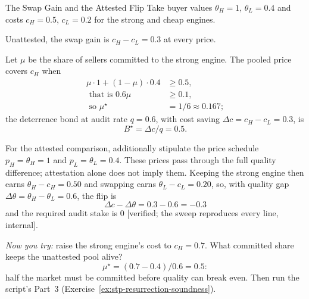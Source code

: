 \documentclass[11pt,a4paper]{article}
\theoremstyle{definition}
\begin{document}
\begin{pdexample}{The Swap Gain and the Attested Flip}
\setlength{\parskip}{4pt plus 1pt}
Take buyer values $\theta_H=1$, $\theta_L=0.4$ and costs $c_H=0.5$, $c_L=0.2$
for the strong and cheap engines.

Unattested, the swap
gain is $c_H-c_L=0.3$ at every price.

Let $\mu$ be the share of sellers committed to the strong engine. The pooled
price covers $c_H$ when
\[
\begin{aligned}
\mu\cdot 1+(1-\mu)\cdot 0.4 &\ge 0.5,\\
\text{ that is }0.6\mu &\ge 0.1,\\
\text{ so }\mu^\star &=1/6\approx 0.167;
\end{aligned}
\]
the deterrence bond at audit rate $q=0.6$, with cost saving
$\Delta c=c_H-c_L=0.3$, is
\[
B^\star=\Delta c/q=0.5.
\]

For the attested comparison, additionally stipulate the price schedule
$p_H=\theta_H=1$ and $p_L=\theta_L=0.4$. These prices pass through the full
quality difference; attestation alone does not imply them. Keeping the strong
engine then earns $\theta_H-c_H=0.50$ and swapping earns $\theta_L-c_L=0.20$, so,
with quality gap $\Delta\theta=\theta_H-\theta_L=0.6$, the flip is
\[
\Delta c-\Delta\theta=0.3-0.6=-0.3
\]
and the required audit stake
is $0$ [verified; the sweep reproduces every line, internal].

\emph{Now you
try:} raise the strong engine's cost to $c_H=0.7$. What committed share keeps
the unattested pool alive?
\[
\mu^\star=(0.7-0.4)/0.6=0.5:
\]
half the market
must be committed before quality can break even. Then run the
script's Part~3 (Exercise~\ref{ex:stp-resurrection-soundness}).
\end{pdexample}
\end{document}
